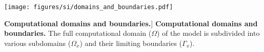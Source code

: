 \begin{figure*}[!b]
\centering
\texttt{[image: figures/si/domains\_and\_boundaries.pdf]}
\caption
[\textbf{Computational domains and boundaries.}]
{
\textbf{Computational domains and boundaries.}
The full computational domain ($\Omega$) of the model is subdivided into various subdomains ($\Omega_x$) and 
their limiting boundaries ($\Gamma_x$).
}

\label{fig:domains_an_boundaries}

\end{figure*}